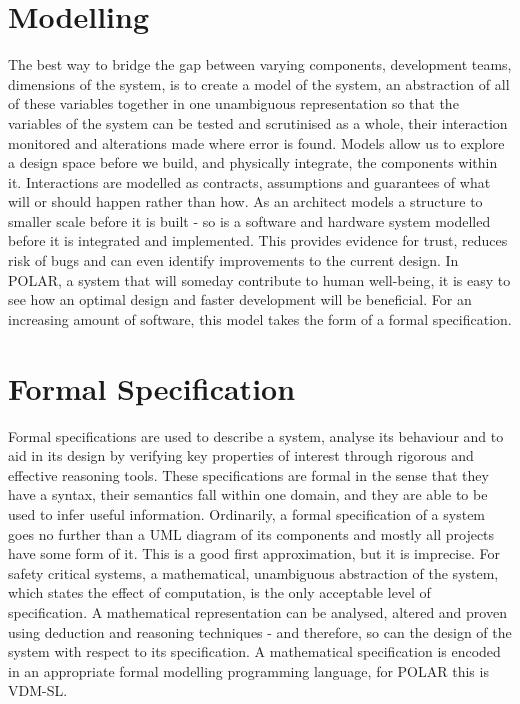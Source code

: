 \section{Modelling}
The best way to bridge the gap between varying components, development teams, dimensions of the system, is to create a model of the system, an abstraction of all of these variables together in one unambiguous representation so that the variables of the system can be tested and scrutinised as a whole, their interaction monitored and alterations made where error is found. Models allow us to explore a design space before we build, and physically integrate, the components within it. Interactions are modelled as contracts, assumptions and guarantees of what will or should happen rather than how. As an architect models a structure to smaller scale before it is built - so is a software and hardware system modelled before it is integrated and implemented. This provides evidence for trust, reduces risk of bugs and can even identify improvements to the current design. In POLAR, a system that will someday contribute to human well-being, it is easy to see how an optimal design and faster development will be beneficial. For an increasing amount of software, this model takes the form of a formal specification.

\section{Formal Specification}
Formal specifications are used to describe a system, analyse its behaviour and to aid in its design by verifying key properties of interest through rigorous and effective reasoning tools\parencite{FORMAL1}\parencite{FORMAL2}. These specifications are formal in the sense that they have a syntax, their semantics fall within one domain, and they are able to be used to infer useful information\parencite{Lamsweerde2000}.\parencite{wikiFS} Ordinarily, a formal specification of a system goes no further than a UML diagram of its components and mostly all projects have some form of it. This is a good first approximation, but it is imprecise. For safety critical systems, a mathematical, unambiguous abstraction of the system, which states the effect of computation, is the only acceptable level of specification. A mathematical representation can be analysed, altered and proven using deduction and reasoning techniques - and therefore, so can the design of the system with respect to its specification. A mathematical specification is encoded in an appropriate formal modelling programming language, for POLAR this is VDM-SL.


